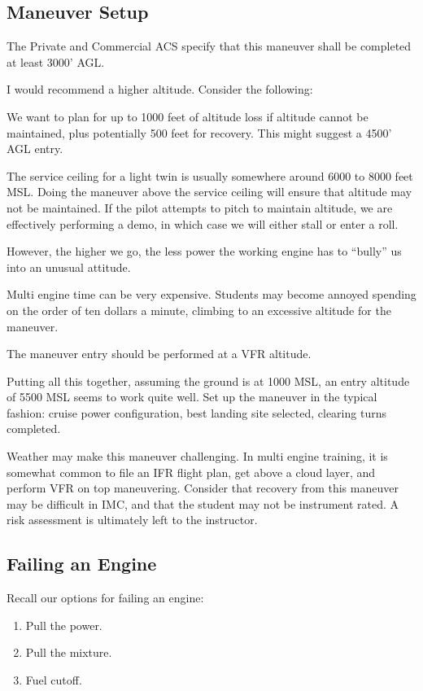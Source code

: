 \subsection{Maneuver Setup}

The Private and Commercial ACS specify that this maneuver shall be completed at least 3000' AGL.

I would recommend a higher altitude. Consider the following:

We want to plan for up to 1000 feet of altitude loss if altitude cannot be maintained, plus potentially 500 feet for recovery. This might suggest a 4500' AGL entry.

The service ceiling for a light twin is usually somewhere around 6000 to 8000 feet MSL. Doing the maneuver above the service ceiling will
ensure that altitude may not be maintained. If the pilot attempts to pitch to maintain altitude, we are effectively performing a \vmc demo,
in which case we will either stall or enter a \vmc roll.

However, the higher we go, the less power the working engine has to ``bully'' us into an unusual attitude.

Multi engine time can be very expensive. Students may become annoyed spending on the order of ten dollars a minute, climbing to an excessive altitude for the maneuver.

The maneuver entry should be performed at a VFR altitude.

Putting all this together, assuming the ground is at 1000 MSL, an entry altitude of 5500 MSL seems to work quite well. Set up the maneuver in the typical fashion: cruise power configuration, best landing site selected, clearing turns completed.

Weather may make this maneuver challenging. In multi engine training, it is somewhat common to file an IFR flight plan, get above a cloud layer, and perform VFR on top maneuvering. Consider that recovery from this maneuver may be difficult in IMC, and that the student may not be instrument rated. A risk assessment is ultimately left to the instructor.

\subsection{Failing an Engine}

Recall our options for failing an engine:

\begin{enumerate}
    \item Pull the power.
    \item Pull the mixture.
    \item Fuel cutoff.
\end{enumerate}

